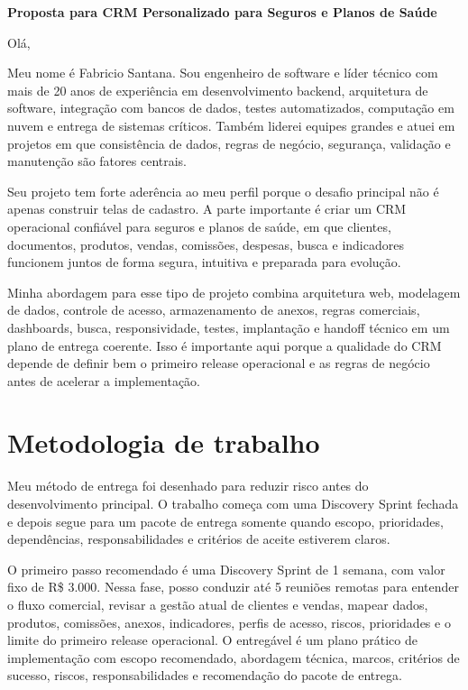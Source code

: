 \documentclass[11pt,a4paper]{article}
\begin{document}
\begin{center}
{\LARGE\bfseries Proposta para CRM Personalizado para Seguros e Planos de Saúde}
\end{center}
\vspace{0.5em}

Olá,\par

Meu nome é Fabricio Santana. Sou engenheiro de software e líder técnico com mais de 20 anos de experiência em desenvolvimento backend, arquitetura de software, integração com bancos de dados, testes automatizados, computação em nuvem e entrega de sistemas críticos. Também liderei equipes grandes e atuei em projetos em que consistência de dados, regras de negócio, segurança, validação e manutenção são fatores centrais.\par

Seu projeto tem forte aderência ao meu perfil porque o desafio principal não é apenas construir telas de cadastro. A parte importante é criar um CRM operacional confiável para seguros e planos de saúde, em que clientes, documentos, produtos, vendas, comissões, despesas, busca e indicadores funcionem juntos de forma segura, intuitiva e preparada para evolução.\par

Minha abordagem para esse tipo de projeto combina arquitetura web, modelagem de dados, controle de acesso, armazenamento de anexos, regras comerciais, dashboards, busca, responsividade, testes, implantação e handoff técnico em um plano de entrega coerente. Isso é importante aqui porque a qualidade do CRM depende de definir bem o primeiro release operacional e as regras de negócio antes de acelerar a implementação.\par

\section*{Metodologia de trabalho}

Meu método de entrega foi desenhado para reduzir risco antes do desenvolvimento principal. O trabalho começa com uma Discovery Sprint fechada e depois segue para um pacote de entrega somente quando escopo, prioridades, dependências, responsabilidades e critérios de aceite estiverem claros.\par

O primeiro passo recomendado é uma Discovery Sprint de 1 semana, com valor fixo de R\$ 3.000. Nessa fase, posso conduzir até 5 reuniões remotas para entender o fluxo comercial, revisar a gestão atual de clientes e vendas, mapear dados, produtos, comissões, anexos, indicadores, perfis de acesso, riscos, prioridades e o limite do primeiro release operacional. O entregável é um plano prático de implementação com escopo recomendado, abordagem técnica, marcos, critérios de sucesso, riscos, responsabilidades e recomendação do pacote de entrega.\par
\end{document}

